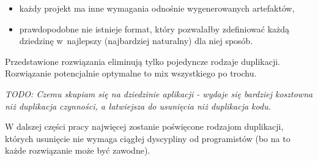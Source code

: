 \begin{itemize}
 \item każdy projekt ma inne wymagania odnośnie wygenerowanych artefaktów,
 \item prawdopodobne nie istnieje format, który pozwalałby zdefiniować każdą dziedzinę w~najlepszy (najbardziej naturalny) dla niej sposób.
\end{itemize}



Przedstawione rozwiązania eliminują tylko pojedyncze rodzaje duplikacji.
Rozwiązanie potencjalnie optymalne to mix wszystkiego po trochu.

\emph{TODO: Czemu skupiam się na dziedzinie aplikacji - wydaje się bardziej kosztowna niż duplikacja czynności, a łatwiejsza do usunięcia niż duplikacja kodu.}

W dalszej części pracy najwięcej zostanie poświęcone rodzajom duplikacji, których usunięcie nie wymaga ciągłej dyscypliny od programistów (bo na to każde rozwiązanie może być zawodne).
